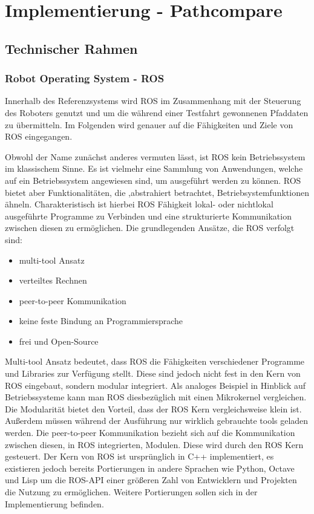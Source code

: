 \chapter{Implementierung - Pathcompare}
\label{sec:implementierung}
\section{Technischer Rahmen}

\subsection{Robot Operating System - ROS}

Innerhalb des Referenzsystems wird \gls{ROS} im Zusammenhang mit der Steuerung
des Roboters genutzt und um die während einer Testfahrt gewonnenen Pfaddaten
zu übermitteln. Im Folgenden wird genauer auf die Fähigkeiten und
Ziele von ROS eingegangen.

Obwohl der Name zunächst anderes vermuten lässt, ist ROS kein
Betriebssystem im klassischem Sinne. Es ist vielmehr eine Sammlung von
Anwendungen, welche auf ein Betriebssystem angewiesen sind, um ausgeführt werden
zu können. ROS bietet aber Funktionalitäten, die ,abstrahiert betrachtet,
Betriebsystemfunktionen ähneln. Charakteristisch ist hierbei ROS Fähigkeit
lokal- oder nichtlokal ausgeführte Programme zu Verbinden und eine
strukturierte Kommunikation zwischen diesen zu ermöglichen. Die grundlegenden
Ansätze, die ROS verfolgt sind:

\begin{itemize}
  \item multi-tool Ansatz
  \item verteiltes Rechnen 
  \item peer-to-peer Kommunikation
  \item keine feste Bindung an Programmiersprache
  \item frei und Open-Source
\end{itemize}

Multi-tool Ansatz bedeutet, dass ROS die Fähigkeiten verschiedener Programme
und Libraries zur Verfügung stellt. Diese sind jedoch nicht fest in den Kern
von ROS eingebaut, sondern modular integriert. Als analoges Beispiel in
Hinblick auf Betriebssysteme kann man ROS diesbezüglich mit einen Mikrokernel
vergleichen. Die Modularität bietet den Vorteil, dass der ROS Kern
vergleichsweise klein ist. Außerdem müssen während der Ausführung nur wirklich
gebrauchte tools geladen werden. Die peer-to-peer Kommunikation bezieht
sich auf die Kommunikation zwischen diesen, in ROS integrierten, Modulen. Diese
wird durch den ROS Kern gesteuert. Der Kern von ROS ist ursprünglich in C++
implementiert, es existieren jedoch bereits Portierungen in andere Sprachen wie
Python, Octave und Lisp um die ROS-\gls{API} einer größeren Zahl von
Entwicklern und Projekten die Nutzung zu ermöglichen. Weitere Portierungen
sollen sich in der Implementierung befinden.

